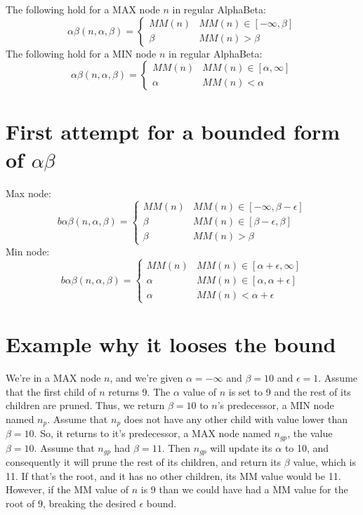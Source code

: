 The following hold for a MAX node $n$ in regular AlphaBeta:\\
\[ \alpha\beta(n,\alpha,\beta)=
  \begin{cases} 
      MM(n)  & MM(n)\in [-\infty,\beta] \\
      \beta & MM(n)>\beta
   \end{cases}
\]
The following hold for a MIN node $n$ in regular AlphaBeta:\\
\[ \alpha\beta(n,\alpha,\beta)=
  \begin{cases} 
      MM(n)  & MM(n)\in [\alpha,\infty] \\
      \alpha & MM(n)<\alpha
   \end{cases}
\]

\section{First attempt for a bounded form of $\alpha\beta$}


\noindent Max node: \
\[ b\alpha\beta(n,\alpha,\beta)=
  \begin{cases} 
      MM(n)  & MM(n)\in [-\infty,\beta-\epsilon] \\
      \beta & MM(n)\in [\beta-\epsilon,\beta] \\
      \beta & MM(n)>\beta
   \end{cases}
\]
\noindent Min node: \
\[ b\alpha\beta(n,\alpha,\beta)=
  \begin{cases} 
      MM(n)  & MM(n)\in [\alpha+\epsilon,\infty] \\
      \alpha & MM(n)\in [\alpha, \alpha+\epsilon] \\     
      \alpha & MM(n)<\alpha+\epsilon
   \end{cases}
\]



\section{Example why it looses the bound}

We're in a MAX node $n$, and we're given $\alpha=-\infty$ and $\beta=10$ and $\epsilon=1$. Assume that the first child of $n$ returns 9. 
The $\alpha$ value of $n$ is set to 9 and the rest of its children are pruned. 
Thus, we return $\beta=10$ to $n$'s predecessor, a MIN node named $n_p$. 
Assume that $n_p$ does not have any other child with value lower than $\beta=10$.
So, it returns to it's predecessor, a MAX node named $n_{gp}$, 
the value $\beta=10$. Assume that $n_{gp}$ had $\beta=11$. 
Then $n_{gp}$ will update its $\alpha$ to 10, and consequently it will prune the rest of its children, and return its $\beta$ value, which is 11. 
If that's the root, and it has no other children, its MM value would be 11. 
However, if the MM value of $n$ is 9 than we could have had a MM value for the root of 9, breaking the desired $\epsilon$ bound. 




